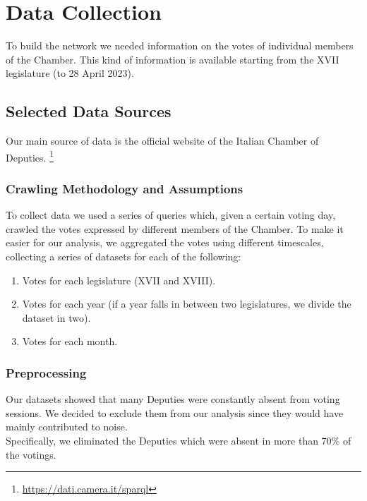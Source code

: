
\section{Data Collection}

To build the network we needed information on the votes of individual members of the Chamber. This kind of information is available starting from the XVII legislature (to 28 April 2023).


\subsection{Selected Data Sources}

Our main source of data is the official website of the Italian Chamber of Deputies. \footnote{\url{https://dati.camera.it/sparql}}



\subsubsection{Crawling Methodology and Assumptions}

To collect data we used a series of queries which, given a certain voting day, crawled the votes expressed by different members of the Chamber.
 To make it easier for our analysis, we aggregated the votes using different timescales, collecting a series of datasets for each of the following:

\begin{enumerate}
\item Votes for each legislature (XVII and XVIII).
\item Votes for each year (if a year falls in between two legislatures, we divide the dataset in two).
\item Votes for each month.
\end{enumerate}

\subsubsection{Preprocessing}

Our datasets showed that many Deputies were constantly absent from voting sessions. We decided to exclude them from our analysis since they would have mainly contributed to noise.\\

Specifically, we eliminated the Deputies which were absent in more than 70\% of the votings. 
